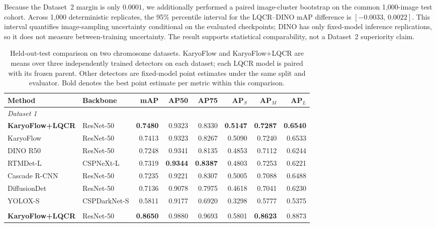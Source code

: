 \documentclass[journal,10pt]{IEEEtran}
\theoremstyle{definition}
\begin{document}
Because the Dataset~2 margin is only $0.0001$, we additionally performed a
paired image-cluster bootstrap on the common 1,000-image test cohort. Across
1,000 deterministic replicates, the 95\% percentile interval for the LQCR--DINO
mAP difference is $[-0.0033,\,0.0022]$. This interval quantifies image-sampling
uncertainty conditional on the evaluated checkpoints; DINO has only fixed-model
inference replications, so it does not measure between-training uncertainty.
The result supports statistical comparability, not a Dataset~2 superiority
claim.

\begin{table}[t]
  \centering
  \footnotesize
  \setlength{\tabcolsep}{3pt}
  \caption{Held-out-test comparison on two chromosome datasets. KaryoFlow and
  KaryoFlow+LQCR are means over three independently trained detectors on each
  dataset; each LQCR model is paired with its frozen parent. Other detectors
  are fixed-model point estimates under the same split and evaluator. Bold
  denotes the best point estimate per metric within this comparison.}
  \label{tab:sota}
  \begin{tabular}{@{}llrrrrrr@{}}
    \toprule
    Method & Backbone & mAP & AP50 & AP75 & AP$_S$ & AP$_M$ & AP$_L$ \\
    \midrule
    \multicolumn{8}{l}{\textit{Dataset 1}} \\
    \textbf{KaryoFlow+LQCR} & ResNet-50 & \textbf{0.7480} & 0.9323 & 0.8330 & \textbf{0.5147} & \textbf{0.7287} & \textbf{0.6540} \\
    KaryoFlow              & ResNet-50    & 0.7413 & 0.9323 & 0.8267 & 0.5090 & 0.7240 & 0.6533 \\
    DINO R50               & ResNet-50    & 0.7248 & 0.9341 & 0.8135 & 0.4853 & 0.7112 & 0.6244 \\
    RTMDet-L               & CSPNeXt-L    & 0.7319 & \textbf{0.9344} & \textbf{0.8387} & 0.4803 & 0.7253 & 0.6221 \\
    Cascade R-CNN          & ResNet-50    & 0.7235 & 0.9221 & 0.8307 & 0.5005 & 0.7088 & 0.6488 \\
    DiffusionDet           & ResNet-50    & 0.7136 & 0.9078 & 0.7975 & 0.4618 & 0.7041 & 0.6230 \\
    YOLOX-S                & CSPDarkNet-S & 0.5811 & 0.9177 & 0.6920 & 0.3298 & 0.5777 & 0.5375 \\
    \addlinespace[2pt]
    \multicolumn{8}{l}{\textit{Dataset 2}} \\
    \textbf{KaryoFlow+LQCR} & ResNet-50 & \textbf{0.8650} & 0.9880 & 0.9693 & 0.5801 & \textbf{0.8623} & 0.8873 \\

\end{tabular}
\end{table}
\end{document}

